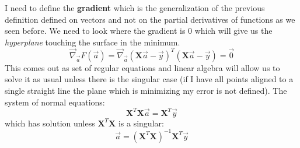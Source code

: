 \documentclass{article}
\begin{document}
I need to define the \textbf{gradient} which is the generalization of the previous definition
defined on vectors and not on the partial derivatives of functions as we seen before.
We need to look where the gradient is $0$ which will give us the \textit{hyperplane}
touching the surface in the minimum.
$$\vec{\nabla}_{\vec{a}} F(\vec{a})=\vec{\nabla}_{\vec{a}}(\textbf{X}\vec{a}-\vec{y})^T(\textbf{X}\vec{a}-\vec{y})=\vec{0}$$
This comes out as set of regular equations and linear algebra will allow us to solve it as
usual unless there is the singular case (if I have all points aligned to a single straight line
the plane which is minimizing my error is not defined).
\newline\newline
The system of normal equations:
$$\textbf{X}^T\textbf{X}\vec{a}=\textbf{X}^T\vec{y}$$
which has solution unless $\textbf{X}^T\textbf{X}$ is a singular:
$$\vec{a}=(\textbf{X}^T\textbf{X})^{-1}\textbf{X}^T\vec{y}$$
\end{document}
